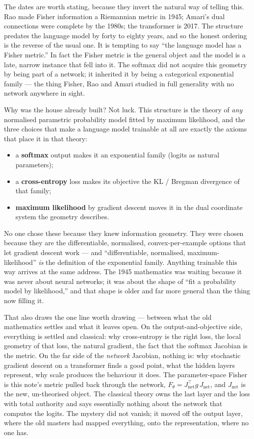\documentclass[11pt]{article}
\begin{document}
The dates are worth stating, because they invert the natural way of telling this. Rao made
Fisher information a Riemannian metric in 1945; Amari's dual connections were complete by the
1980s; the transformer is 2017. The structure predates the language model by forty to eighty
years, and so the honest ordering is the reverse of the usual one. It is tempting to say ``the
language model has a Fisher metric.'' In fact the Fisher metric is the general object and the
model is a late, narrow instance that fell into it. The softmax did not acquire this geometry
by being part of a network; it inherited it by being a categorical exponential family --- the
thing Fisher, Rao and Amari studied in full generality with no network anywhere in sight.

Why was the house already built? Not luck. This structure is the theory of \emph{any}
normalised parametric probability model fitted by maximum likelihood, and the three choices that
make a language model trainable at all are exactly the axioms that place it in that theory:
\begin{itemize}[leftmargin=1.5em]
  \item a \textbf{softmax} output makes it an exponential family (logits as natural parameters);
  \item a \textbf{cross-entropy} loss makes its objective the KL / Bregman divergence of that family;
  \item \textbf{maximum likelihood} by gradient descent moves it in the dual coordinate system
  the geometry describes.
\end{itemize}
No one chose these because they knew information geometry. They were chosen because they are the
differentiable, normalised, convex-per-example options that let gradient descent work --- and
``differentiable, normalised, maximum-likelihood'' \emph{is} the definition of the exponential
family. Anything trainable this way arrives at the same address. The 1945 mathematics was
waiting because it was never about neural networks; it was about the shape of ``fit a
probability model by likelihood,'' and that shape is older and far more general than the thing
now filling it.

That also draws the one line worth drawing --- between what the old mathematics settles and what
it leaves open. On the output-and-objective side, everything is settled and classical: why
cross-entropy is the right loss, the local geometry of that loss, the natural gradient, the fact
that the softmax Jacobian is the metric. On the far side of the \emph{network} Jacobian, nothing
is: why stochastic gradient descent on a transformer finds a good point, what the hidden layers
represent, why scale produces the behaviour it does. The parameter-space Fisher is this note's
metric pulled back through the network, $F_\theta = J_{\mathrm{net}}^{\top} g\, J_{\mathrm{net}}$,
and $J_{\mathrm{net}}$ is the new, un-theorised object. The classical theory owns the last layer
and the loss with total authority and says essentially nothing about the network that computes
the logits. The mystery did not vanish; it moved off the output layer, where the old masters had
mapped everything, onto the representation, where no one has.
\end{document}
